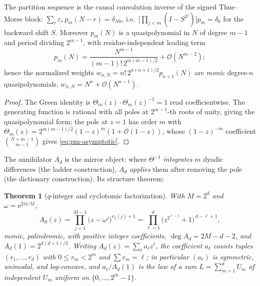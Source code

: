 \documentclass[11pt,oneside]{article}
\numberwithin{equation}{section}
\newtheorem{theorem}{Theorem}[section]
\theoremstyle{definition}
\theoremstyle{remark}
\newcommand{\e}{\mathrm e}
\newcommand{\ii}{\mathrm i}
\newcommand{\bigO}{\mathcal O}
\newcommand{\eps}{\varepsilon}
\newcommand{\vtwo}{\nu_2}
\newcommand{\ThetaTM}{\Theta}
\begin{document}
\begin{proposition}
\label{prop:tm-green}
The partition sequence is the causal convolution inverse of the
signed Thue--Morse block:
$\sum_{r}\eps_r\,p_m(N-r)=\delta_{N0}$, i.e.\
$\bigl[\prod_{j<m}(I-S^{2^{j}})\bigr]p_m=\delta_0$ for the backward
shift $S$.  Moreover $p_m(N)$ is a quasipolynomial in $N$ of degree
$m-1$ and period dividing $2^{m-1}$, with residue-independent leading
term
\begin{equation}
 p_m(N)=\frac{N^{m-1}}{(m-1)!\,2^{m(m-1)/2}}+\bigO(N^{m-2});
 \label{eq:pm-asymptotic}
\end{equation}
hence the normalized weights $w_{n,N}=n!\,2^{n(n+1)/2}p_{n+1}(N)$ are
\emph{monic} degree-$n$ quasipolynomials, $w_{n,N}=N^{n}+\bigO(N^{n-1})$.
\end{proposition}

\begin{proof}
The Green identity is
$\ThetaTM_m(z)\cdot\ThetaTM_m(z)^{-1}=1$ read coefficientwise.  The
generating function is rational with all poles at $2^{m-1}$-th roots
of unity, giving the quasipolynomial form; the pole at $z=1$ has
order $m$ with
$\ThetaTM_m(z)=2^{m(m-1)/2}(1-z)^{m}(1+\bigO(1-z))$, whose
$(1-z)^{-m}$ coefficient $\binom{N+m-1}{m-1}$ gives
\eqref{eq:pm-asymptotic}.
\end{proof}

The annihilator $A_d$ is the mirror object: where
$\ThetaTM^{-1}$ \emph{integrates} $m$ dyadic differences (the ladder
construction), $A_d$ \emph{applies} them after removing the pole
(the dictionary construction).  Its structure theorem:

\begin{theorem}[$q$-integer and cyclotomic factorization]
\label{thm:A-factor}
With $M=2^{d}$ and $\omega=\e^{2\pi\ii/M}$,
\begin{equation}
 A_d(z)=\prod_{j=1}^{M-1}\bigl(z-\omega^{j}\bigr)^{\vtwo(j)+1}
 =\prod_{\ell=1}^{d}\bigl(z^{2^{\ell-1}}+1\bigr)^{\,d-\ell+1},
 \label{eq:A-cyclotomic}
\end{equation}
monic, palindromic, with positive integer coefficients,
$\deg A_d=2M-d-2$, and $A_d(1)=2^{d(d+1)/2}$.  Writing
$A_d(z)=\sum_\ell a_\ell z^{\ell}$, the coefficient $a_\ell$ counts
tuples $(r_1,\dots,r_d)$ with $0\le r_m<2^{m}$ and $\sum r_m=\ell$;
in particular $(a_\ell)$ is symmetric, unimodal, and log-concave, and
$a_\ell/A_d(1)$ is the law of a sum
$L=\sum_{m=1}^{d}U_m$ of independent $U_m$ uniform on
$\{0,\dots,2^{m}-1\}$.
\end{theorem}
\end{document}
